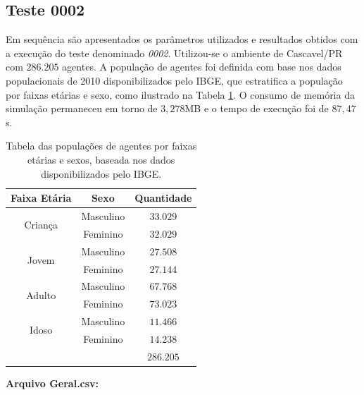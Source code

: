 \subsection{Teste 0002}

Em sequência são apresentados os parâmetros utilizados e resultados obtidos com a execução do teste denominado \textit{0002}. Utilizou-se o ambiente de Cascavel/PR com $286.205$ agentes. A população de agentes foi definida com base nos dados populacionais de 2010 disponibilizados pelo IBGE, que estratifica a população por faixas etárias e sexo, como ilustrado na Tabela \ref{tab:populacoes_0002}. O consumo de memória da simulação permaneceu em torno de $3,278$MB e o tempo de execução foi de $87,47$s. \\

\begin{table}[H]
\centering
\begin{tabular}{c|c|c}
 \textbf{Faixa Etária} 		& \textbf{Sexo}		& \textbf{Quantidade}	\\ \hline
  \multirow{2}{*}{Criança}	& Masculino		& $33.029$		\\
				& Feminino		& $32.029$		\\
  \multirow{2}{*}{Jovem}	& Masculino		& $27.508$		\\
				& Feminino		& $27.144$		\\
  \multirow{2}{*}{Adulto}	& Masculino		& $67.768$		\\
				& Feminino		& $73.023$		\\
  \multirow{2}{*}{Idoso}	& Masculino		& $11.466$		\\
				& Feminino		& $14.238$		\\ \hline
  \multicolumn{2}{c|}{}					& $286.205$		\\
\end{tabular}
\caption{Tabela das populações de agentes por faixas etárias e sexos, baseada nos dados disponibilizados pelo IBGE.}
\label{tab:populacoes_0002}
\end{table}

\newpage

\textbf{Arquivo Geral.csv:} 

\begin{center}
\end{center}

